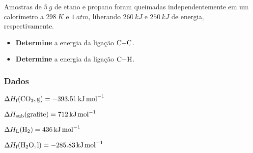 \documentclass[braun, twocolumn]{braun}
\begin{document}
\begin{problem}
[2A38]Amostras de \(\qty{5}{g}\) de etano e propano foram queimadas
independentemente em um calorímetro a \(\qty{298}{K}\) e \(\qty{1}{atm}\),
liberando \(\qty{260}{kJ}\) e \(\qty{250}{kJ}\) de energia, respectivamente.

\begin{itemize}

\item
  \textbf{Determine} a energia da ligação \(\ce{C-C}\).
\item
  \textbf{Determine} a energia da ligação \(\ce{C-H}\).
\end{itemize}
\subsubsection*{Dados}


\begin{datalist}

\item $\Delta H_\text{f}(\ce{CO2, {g}}) = \qty{-393,51}{kJ.mol^{-1}}$
\item $\Delta H_\text{sub}(\ce{grafite}) = \qty{712}{kJ.mol^{-1}}$
\item $\Delta H_\text{L}(\ce{H2}) = \qty{436}{kJ.mol^{-1}}$
\item $\Delta H_\text{f}(\ce{H2O, {l}}) = \qty{-285,83}{kJ.mol^{-1}}$
\end{datalist}

\end{problem}
\end{document}
